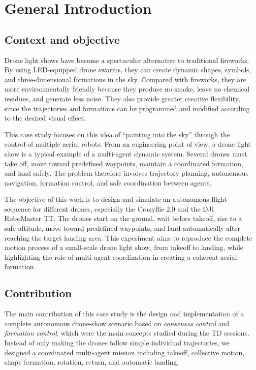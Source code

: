 \chapter{General Introduction}
\label{ch:Introduction}


\section{Context and objective}
\label{sec:Contexte}
Drone light shows have become a spectacular alternative to traditional fireworks. By using LED-equipped drone swarms, they can create dynamic shapes, symbols, and three-dimensional formations in the sky. Compared with fireworks, they are more environmentally friendly because they produce no smoke, leave no chemical residues, and generate less noise. They also provide greater creative flexibility, since the trajectories and formations can be programmed and modified according to the desired visual effect.

This case study focuses on this idea of ``painting into the sky'' through the control of multiple aerial robots. From an engineering point of view, a drone light show is a typical example of a multi-agent dynamic system. Several drones must take off, move toward predefined waypoints, maintain a coordinated formation, and land safely. The problem therefore involves trajectory planning, autonomous navigation, formation control, and safe coordination between agents.

The objective of this work is to design and simulate an autonomous flight sequence for different drones, especially the Crazyflie 2.0 and the DJI RoboMaster TT. The drones start on the ground, wait before takeoff, rise to a safe altitude, move toward predefined waypoints, and land automatically after reaching the target landing area. This experiment aims to reproduce the complete motion process of a small-scale drone light show, from takeoff to landing, while highlighting the role of multi-agent coordination in creating a coherent aerial formation.


\section{Contribution}
\label{sec:contribution}

The main contribution of this case study is the design and implementation of a complete autonomous drone-show scenario based on \textit{consensus control} and \textit{formation control}, which were the main concepts studied during the TD sessions. Instead of only making the drones follow simple individual trajectories, we designed a coordinated multi-agent mission including takeoff, collective motion, shape formation, rotation, return, and automatic landing.

